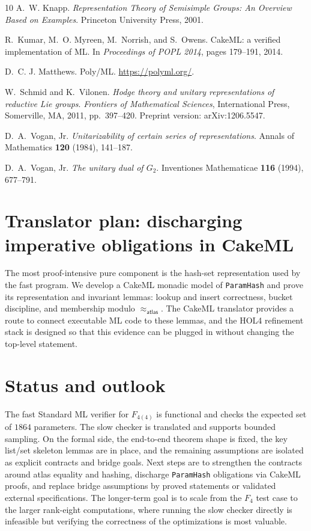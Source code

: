\documentclass{easychair}
\def\atlas{\textsf{atlas}\xspace}
\def\sml{\textsf{Standard ML}\xspace}
\def\holfour{\textsf{HOL4}\xspace}
\def\cakeml{\textsf{CakeML}\xspace}
\newcommand{\atlasEq}{\mathrel{\approx_{\atlas}}}
\begin{document}
\begin{thebibliography}{10}
A.~W. Knapp.
\newblock \emph{Representation Theory of Semisimple Groups: An Overview Based on Examples}.
\newblock Princeton University Press, 2001.

R.~Kumar, M.~O. Myreen, M.~Norrish, and S.~Owens.
\newblock CakeML: a verified implementation of ML.
\newblock In \emph{Proceedings of POPL 2014}, pages 179--191, 2014.

D.~C. J. Matthews.
\newblock Poly/ML.
\newblock \url{https://polyml.org/}.

W.~Schmid and K.~Vilonen.
\newblock \emph{Hodge theory and unitary representations of reductive Lie groups}.
\newblock \emph{Frontiers of Mathematical Sciences}, International Press, Somerville, MA, 2011, pp.~397--420.
\newblock Preprint version: arXiv:1206.5547.

D.~A.~Vogan, Jr.
\newblock \emph{Unitarizability of certain series of representations}.
\newblock Annals of Mathematics \textbf{120} (1984), 141--187.

D.~A.~Vogan, Jr.
\newblock \emph{The unitary dual of $G_2$}.
\newblock Inventiones Mathematicae \textbf{116} (1994), 677--791.



\end{thebibliography}



\appendix

\section{Translator plan: discharging imperative obligations in \cakeml}
The most proof-intensive pure component is the hash-set representation used by
the fast program.  We develop a \cakeml monadic model of \texttt{ParamHash} and
prove its representation and invariant lemmas: lookup and insert correctness,
bucket discipline, and membership modulo \(\atlasEq\).  The \cakeml translator
provides a route to connect executable ML code to these lemmas, and the
\holfour refinement stack is designed so that this evidence can be plugged in
without changing the top-level statement.

\section{Status and outlook}
The fast \sml verifier for \(F_{4(4)}\) is functional and checks the expected set
of \(1864\) parameters.  The slow checker is translated and supports bounded
sampling.  On the formal side, the end-to-end theorem shape is fixed, the key
list/set skeleton lemmas are in place, and the remaining assumptions are
isolated as explicit contracts and bridge goals.  Next steps are to strengthen
the contracts around \atlas{} equality and hashing, discharge \texttt{ParamHash}
obligations via \cakeml proofs, and replace bridge assumptions by proved
statements or validated external specifications.  The longer-term goal is to
scale from the \(F_4\) test case to the larger rank-eight computations, where
running the slow checker directly is infeasible but verifying the correctness
of the optimizations is most valuable.
\end{document}
